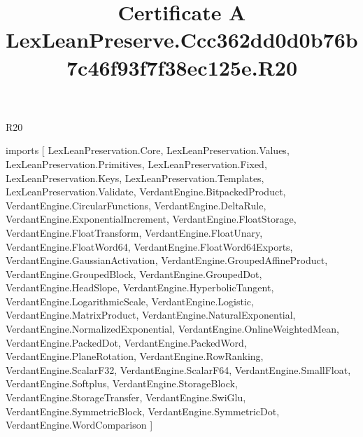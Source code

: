 \begin{lexlean}{R20}
\title{Certificate A LexLeanPreserve.Ccc362dd0d0b76b7c46f93f7f38ec125e.R20}
\begin{coremodule}
imports [
  LexLeanPreservation.Core,
  LexLeanPreservation.Values,
  LexLeanPreservation.Primitives,
  LexLeanPreservation.Fixed,
  LexLeanPreservation.Keys,
  LexLeanPreservation.Templates,
  LexLeanPreservation.Validate,
  VerdantEngine.BitpackedProduct,
  VerdantEngine.CircularFunctions,
  VerdantEngine.DeltaRule,
  VerdantEngine.ExponentialIncrement,
  VerdantEngine.FloatStorage,
  VerdantEngine.FloatTransform,
  VerdantEngine.FloatUnary,
  VerdantEngine.FloatWord64,
  VerdantEngine.FloatWord64Exports,
  VerdantEngine.GaussianActivation,
  VerdantEngine.GroupedAffineProduct,
  VerdantEngine.GroupedBlock,
  VerdantEngine.GroupedDot,
  VerdantEngine.HeadSlope,
  VerdantEngine.HyperbolicTangent,
  VerdantEngine.LogarithmicScale,
  VerdantEngine.Logistic,
  VerdantEngine.MatrixProduct,
  VerdantEngine.NaturalExponential,
  VerdantEngine.NormalizedExponential,
  VerdantEngine.OnlineWeightedMean,
  VerdantEngine.PackedDot,
  VerdantEngine.PackedWord,
  VerdantEngine.PlaneRotation,
  VerdantEngine.RowRanking,
  VerdantEngine.ScalarF32,
  VerdantEngine.ScalarF64,
  VerdantEngine.SmallFloat,
  VerdantEngine.Softplus,
  VerdantEngine.StorageBlock,
  VerdantEngine.StorageTransfer,
  VerdantEngine.SwiGlu,
  VerdantEngine.SymmetricBlock,
  VerdantEngine.SymmetricDot,
  VerdantEngine.WordComparison
]


\end{coremodule}
\end{lexlean}
